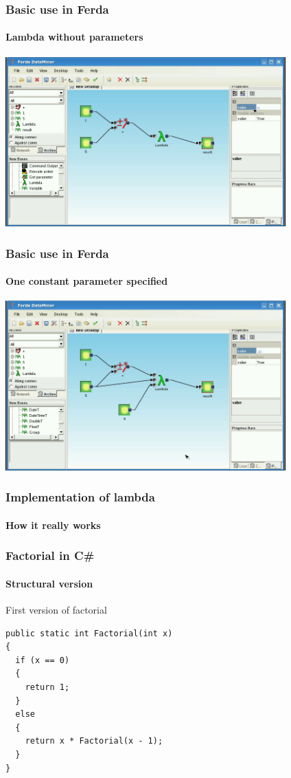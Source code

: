 \documentclass{beamer}
\begin{document}
\begin{frame}
	\frametitle{Basic use in Ferda}
	\framesubtitle{Lambda without parameters}

	\includegraphics[width=10.8cm]{lambdaBasic2.png}
\end{frame}

\begin{frame}
	\frametitle{Basic use in Ferda}
	\framesubtitle{One constant parameter specified}
	\includegraphics[width=10.8cm]{lambdaBasic3.png}
\end{frame}

\begin{frame}
	\frametitle{Implementation of lambda}
	\framesubtitle{How it really works}
\end{frame}

\begin{frame}[fragile]
	\frametitle{Factorial in C\#}
	\framesubtitle{Structural version}

	\begin{block}{First version of factorial}
\begin{verbatim}
public static int Factorial(int x)
{
  if (x == 0)
  {
    return 1;
  }
  else
  {
    return x * Factorial(x - 1);
  }
}
\end{verbatim}
	\end{block}
\end{frame}
\end{document}
